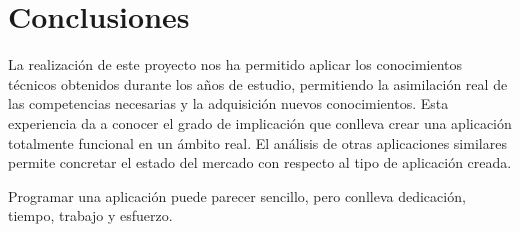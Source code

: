 	\section{Conclusiones}
		La realización de este proyecto nos ha permitido aplicar los conocimientos técnicos obtenidos durante los años de estudio, permitiendo la asimilación real de las competencias necesarias y la adquisición nuevos conocimientos.
		Esta experiencia da a conocer el grado de implicación que conlleva crear una aplicación totalmente funcional en un ámbito real. El análisis de otras aplicaciones similares permite concretar el estado del mercado con respecto al tipo de aplicación creada.
		
		\bigskip
		Programar una aplicación puede parecer sencillo, pero conlleva dedicación, tiempo, trabajo y esfuerzo.